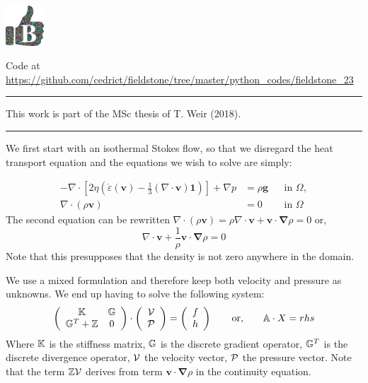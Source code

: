 
\includegraphics[height=1.5cm]{images/pictograms/benchmark}



\begin{center}
Code at \url{https://github.com/cedrict/fieldstone/tree/master/python_codes/fieldstone_23}
\end{center}

\par\noindent\rule{\textwidth}{0.4pt}

This work is part of the MSc thesis of T. Weir (2018).

\par\noindent\rule{\textwidth}{0.4pt}

We first start with an isothermal Stokes flow, so that we disregard the heat transport equation and 
the equations we wish to solve are simply:

\begin{align}
  -\nabla \cdot \left[2\eta \left(\dot\varepsilon(\bm v)
                                  - \frac{1}{3}(\nabla \cdot \bm v)\mathbf 1\right)
                \right] + \nabla p &=
  \rho \bm g
  &
  & \textrm{in $\Omega$},
  \\
  \nabla \cdot (\rho \bm v) &= 0
  &
  & \textrm{in $\Omega$}
\end{align}
The second equation can be rewritten 
$\nabla \cdot (\rho {\bm v}) =  \rho \nabla \cdot {\bm v} + {\bm v} \cdot {\bm \nabla}\rho=0$
or, 
\[
\nabla \cdot {\bm v} + \frac{1}{\rho} {\bm v} \cdot {\bm \nabla}\rho=0
\]
Note that this presupposes that the density is not zero anywhere in the domain.

We use a mixed formulation and therefore  
keep both velocity and pressure as unknowns. We end up having to solve 
the following system:
\[
\left(
\begin{array}{cc}
{\mathbb{K}} & {\mathbb{G}} \\ {\mathbb{G}}^T+{\mathbb{Z}} & 0 
\end{array}
\right)
\cdot
\left(
\begin{array}{c}
{\cal V} \\ {\cal P}
\end{array}
\right)
=
\left(
\begin{array}{c}
 f \\ h
\end{array}
\right)
\quad\quad
{\rm or,}
\quad\quad
{\mathbb{A}} \cdot X = rhs
\]
Where ${\mathbb{K}}$ is the stiffness matrix, ${\mathbb{G}}$ is the discrete gradient operator, 
${\mathbb{G}}^T$ is the discrete divergence operator, ${\cal V}$ the velocity vector, 
${\cal P}$ the pressure vector.
Note that the term ${\mathbb{Z}}{\cal V}$ derives from term ${\bm v} \cdot {\bm \nabla} \rho$ in the continuity equation. 


